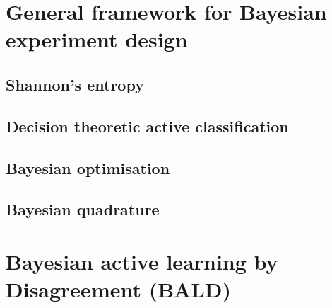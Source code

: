 \section{General framework for Bayesian experiment design}
	\subsection{Shannon's entropy}
	\subsection{Decision theoretic active classification}
	\subsection{Bayesian optimisation}
	\subsection{Bayesian quadrature}
\section{Bayesian active learning by Disagreement (BALD)}